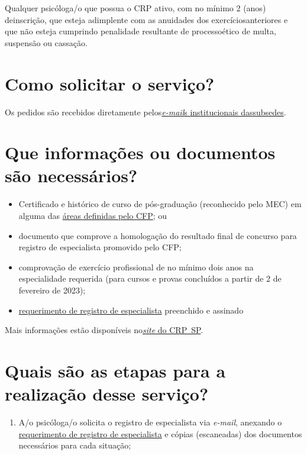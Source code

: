 Qualquer psicóloga/o que possua o CRP ativo, com no mínimo 2 (anos) deinscrição, que esteja adimplente com as anuidades dos exercíciosanteriores e que não esteja cumprindo penalidade resultante de processoético de multa, suspensão ou cassação.

\section{Como solicitar o serviço?}

Os pedidos são recebidos diretamente pelos\href{https://crpsp.org/sede/index}{\emph{e-mail}s institucionais dassubsedes}.

\section{Que informações ou documentos são necessários?}

\begin{itemize}
  \item  Certificado e histórico de curso de pós-graduação (reconhecido pelo  MEC) em alguma das  \href{https://site.cfp.org.br/servicos/titulo-de-especialista/}{áreas  definidas pelo CFP}; ou
  \item  documento que comprove a homologação do resultado final de concurso  para registro de especialista promovido pelo CFP;
  \item  comprovação de exercício profissional de no mínimo dois anos na  especialidade requerida (para cursos e provas concluídos a partir de 2  de fevereiro de 2023);
  \item  \hyperref[]{requerimento de  registro de especialista} preenchido e assinado
\end{itemize}

Mais informações estão disponíveis no\href{http://www.crpsp.org/pagina/view/51}{\emph{site} do CRP~SP}.

\section{Quais são as etapas para a realização desse serviço?}

\begin{enumerate}
  \item  A/o psicóloga/o solicita o registro de especialista via \emph{e-mail},  anexando o  \hyperref[]{requerimento de  registro de especialista} e cópias (escaneadas) dos documentos  necessários para cada situação;
\end{enumerate}


